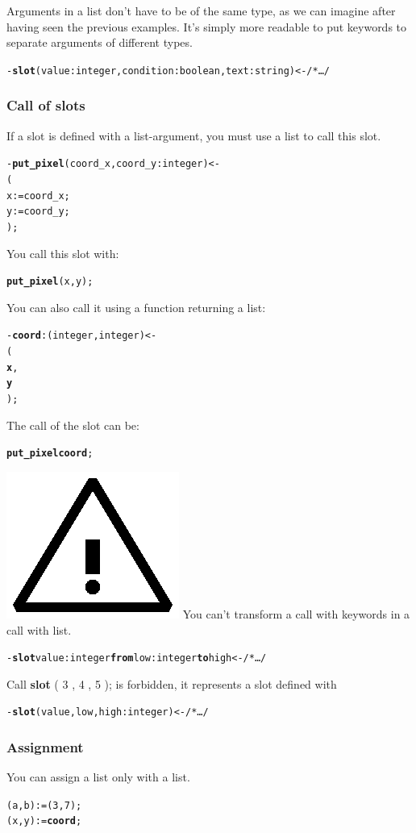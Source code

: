\documentclass[11pt]{mybook}
\newcommand{\warning}{\includegraphics[scale=0.3]{figures/warning}}
\begin{document}
Arguments in a list don't have to be of the same type, as we can imagine after having seen the previous examples. It's simply more readable to put keywords to separate arguments of different types.
\begin{alltt}
  - {\bf{}slot} (value:{\sc{}integer},condition:{\sc{}boolean},text:{\sc{}string}) <- /* \ldots */
\end{alltt}

\subsubsection{Call of slots}
\label{language_reference:lists:use:call}
If a slot is defined with a list-argument, you must use a list to call this slot.
\begin{alltt}
  - {\bf{}put\_pixel} (coord\_x,coord\_y:{\sc{}integer}) <-
  (
     x := coord\_x;
     y := coord\_y;
  );\\
\end{alltt}
You call this slot with:
\begin{alltt}
{\bf{}put\_pixel} (x,y);
\end{alltt}
You can also call it using a function returning a list:
\begin{alltt}
  - {\bf{}coord}:({\sc{}integer,integer}) <-
  (
     {\bf{}x},
     {\bf{}y}
  );                          
\end{alltt}
The call of the slot can be:
\begin{alltt}
{\bf{}put\_pixel} {\bf{}coord};
\end{alltt}
\warning{} You can't transform a call with keywords in a call with list.
\begin{alltt}
  - {\bf{}slot} value:{\sc{}integer} {\bf{}from} low:{\sc{}integer} {\bf{}to} high <- /* \ldots */
\end{alltt}
 Call {\bf{}slot} ( 3 , 4 , 5 ); is forbidden, it represents a slot defined with
\begin{alltt}
  - {\bf{}slot} (value,low,high:{\sc{}integer}) <- /* \ldots */
\end{alltt}

\subsubsection{Assignment}
\label{language_reference:lists:use:assignment}
You can assign a list only with a list.
\begin{alltt}
  ( a , b ) := ( 3 , 7 );
  ( x , y ) := {\bf{}coord};
\end{alltt}
\end{document}
